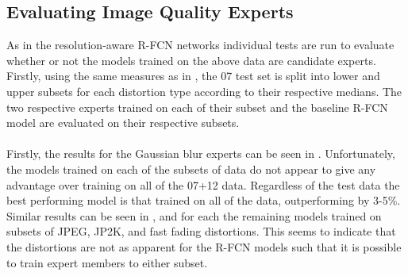 \subsection{Evaluating Image Quality Experts}\label{sec:iq_experts}
As in the resolution-aware R-FCN networks individual tests are run to evaluate whether or not the models trained on the above data are candidate experts. Firstly, using the same measures as in , the 07 test set is split into lower and upper subsets for each distortion type according to their respective medians. The two respective experts trained on each of their subset and the baseline R-FCN model are evaluated on their respective subsets.
\\\\
Firstly, the results for the Gaussian blur experts can be seen in . Unfortunately, the models trained on each of the subsets of data do not appear to give any advantage over training on all of the 07+12 data. Regardless of the test data the best performing model is that trained on all of the data, outperforming by 3-5\%. Similar results can be seen in ,  and  for each the remaining models trained on subsets of JPEG, JP2K, and fast fading distortions. This seems to indicate that the distortions are not as apparent for the R-FCN models such that it is possible to train expert members to either subset.

